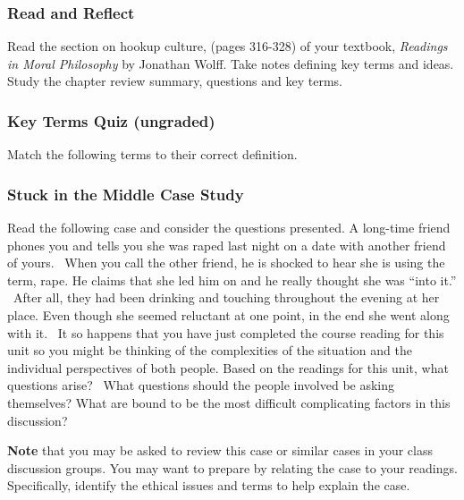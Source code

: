 \documentclass[
]{book}
\begin{document}
\begin{reflect}
\hypertarget{read-and-reflect}{%
\subsubsection*{Read and Reflect}\label{read-and-reflect}}

Read the section on hookup culture, (pages 316-328) of your textbook, \emph{Readings in Moral Philosophy} by Jonathan Wolff. Take notes defining key terms and ideas.
Study the chapter review summary, questions and key terms.

\hypertarget{key-terms-quiz-ungraded-4}{%
\subsubsection{Key Terms Quiz (ungraded)}\label{key-terms-quiz-ungraded-4}}

Match the following terms to their correct definition.

\hypertarget{stuck-in-the-middle-case-study-1}{%
\subsubsection*{Stuck in the Middle Case Study}\label{stuck-in-the-middle-case-study-1}}

Read the following case and consider the questions presented.
A long-time friend phones you and tells you she was raped last night on a date with another friend of yours. ~When you call the other friend, he is shocked to hear she is using the term, rape. He claims that she led him on and he really thought she was ``into it.'' ~After all, they had been drinking and touching throughout the evening at her place. Even though she seemed reluctant at one point, in the end she went along with it. ~It so happens that you have just completed the course reading for this unit so you might be thinking of the complexities of the situation and the individual perspectives of both people.
Based on the readings for this unit, what questions arise? ~What questions should the people involved be asking themselves? What are bound to be the most difficult complicating factors in this discussion? ~
\end{reflect}

\begin{caution}
\textbf{Note} that you may be asked to review this case or similar cases in your class discussion groups. You may want to prepare by relating the case to your readings. Specifically, identify the ethical issues and terms to help explain the case.
\end{caution}
\end{document}
